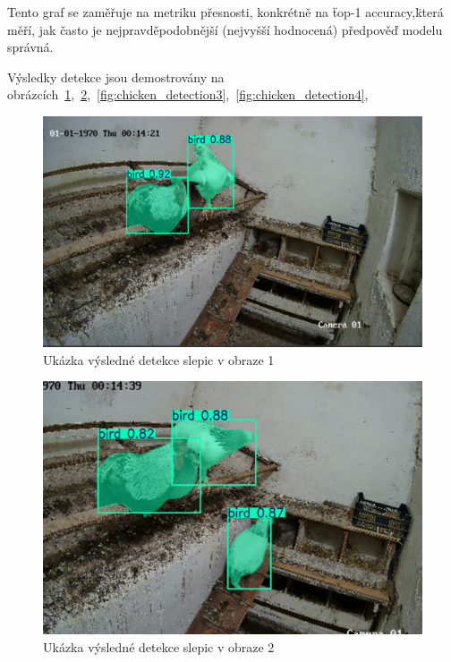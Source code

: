 Tento graf se zaměřuje na metriku přesnosti, konkrétně na \"top-1 accuracy,\" která měří, jak často je nejpravděpodobnější (nejvyšší hodnocená) předpověď modelu správná.

Výsledky detekce jsou demostrovány na obrázcích~\ref{fig:chicken_detection1},~\ref{fig:chicken_detection2},~\ref{fig:chicken_detection3},~\ref{fig:chicken_detection4},

\newpage
\begin{figure}[h]
    \centering
    \includegraphics[width=\textwidth]{img/chicken_detection1}
    \caption{Ukázka výsledné detekce slepic v obraze 1}
    \label{fig:chicken_detection1}
\end{figure}
\begin{figure}[h]
    \centering
    \includegraphics[width=\textwidth]{img/chicken_detection2}
    \caption{Ukázka výsledné detekce slepic v obraze 2}
    \label{fig:chicken_detection2}
\end{figure}
\newpage
